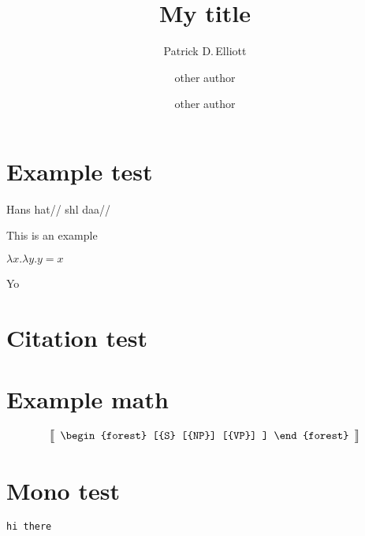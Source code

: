 \documentclass[12pt,a4paper]{ling-paper}
\title{My title}
\author{Patrick D.\,Elliott
\and
other author
\and
other author}
\begin{document}
\maketitle

\section{Example test}

\ex
\begingl
\gla Hans hat//
\glb shl daa//
\endgl
\xe

\ex
This is an example
\xe

\ex
\(λ x . λ y . y = x\)
\xe

Yo

\section{Citation test}

\cite{heim_presupposition_1992}

\section{Example math}



\[
\left\llbracket
\begin{array}{c}
\begin{forest}
[{S}
  [{NP}]
  [{VP}]
]
\end{forest}
\end{array}
\right\rrbracket
\]

\section{Mono test}

\texttt{hi there}

\printbibliography
\end{document}
